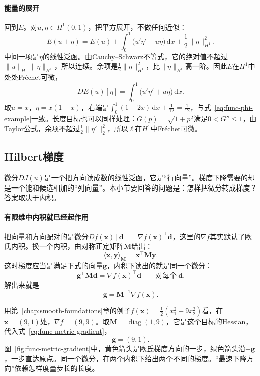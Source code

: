 \paragraph{能量的展开}
回到$E$。对$u,\eta\in H^1(0,1)$，把平方展开，不做任何近似：
\begin{equation}
 E(u+\eta)=E(u)+\int_0^1\bigl(u'\eta'+u\eta\bigr)\,\mathrm{d}x+\frac12\lVert\eta\rVert_{H^1}^2.
 \label{eq:func-energy-expansion}
\end{equation}
中间一项是$\eta$的线性泛函。由Cauchy--Schwarz不等式，它的绝对值不超过$\lVert u\rVert_{H^1}\lVert\eta\rVert_{H^1}$，所以连续。余项是$\frac12\lVert\eta\rVert_{H^1}^2$，比$\lVert\eta\rVert_{H^1}$高一阶。因此$E$在$H^1$中处处Fréchet可微，
\begin{equation}
 DE(u)[\eta]=\int_0^1\bigl(u'\eta'+u\eta\bigr)\,\mathrm{d}x.
 \label{eq:func-energy-derivative}
\end{equation}
取$u=x$，$\eta=x(1-x)$，右端是$\int_0^1(1-2x)\,\mathrm{d}x+\frac1{12}=\frac1{12}$，与式~\eqref{eq:func-phi-example}一致。长度目标也可以同样处理：$G(p)=\sqrt{1+p^2}$满足$0<G''\leq1$，由Taylor公式，余项不超过$\frac12\lVert\eta'\rVert_2^2$，所以$\ell$在$H^1$中Fréchet可微。

\subsection{Hilbert梯度}
\label{sec:func-hilbert-gradient}

微分$DJ(u)$是一个把方向读成数的线性泛函，它是“行向量”。梯度下降需要的却是一个能和候选相加的“列向量”。本小节要回答的问题是：怎样把微分转成梯度？答案取决于内积。

\paragraph{有限维中内积就已经起作用}
把向量和方向配对的是微分$Df(\bm{x})[\bm{d}]=\nabla f(\bm{x})^\top\bm{d}$，这里的$\nabla f$其实默认了欧氏内积。换一个内积，由对称正定矩阵$\bm{M}$给出：
\[
 \langle\bm{x},\bm{y}\rangle_{\bm{M}}=\bm{x}^\top\bm{M}\bm{y}.
\]
这时梯度应当是满足下式的向量$\bm{g}$，内积下读出的就是同一个微分：
\[
 \bm{g}^\top\bm{M}\bm{d}=\nabla f(\bm{x})^\top\bm{d}\qquad\text{对每个}\ \bm{d}.
\]
解出来就是
\begin{equation}
 \bm{g}=\bm{M}^{-1}\nabla f(\bm{x}).
 \label{eq:func-metric-gradient}
\end{equation}

用第~\ref{chap:smooth-foundations}章的例子$f(\bm{x})=\frac12(x_1^2+9x_2^2)$看，在$\bm{x}=(9,1)$处，$\nabla f=(9,9)$。取$\bm{M}=\operatorname{diag}(1,9)$，它是这个目标的Hessian，代入式~\eqref{eq:func-metric-gradient}，
\[
 \bm{g}=(9,1).
\]
图~\ref{fig:func-metric-gradient}中，黄色箭头是欧氏梯度方向的一步，绿色箭头沿$-\bm{g}$，一步直达原点。同一个微分，在两个内积下给出两个不同的梯度。“最速下降方向”依赖怎样度量步长的长度。

